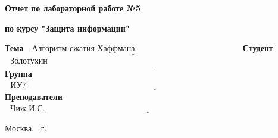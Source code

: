 \begin{center}
	\Large\textbf{Отчет по лабораторной работе №5}
	
	\Large\textbf {по курсу "Защита информации"}
\end{center}


\noindent\textbf{Тема} $\underline{\text{~~Алгоритм сжатия Хаффмана~~~~~~~~~~~~~~~~~~~~~~~~~~~~~~~~~~~~~~}}$\newline\newline
\noindent\textbf{Студент} $\underline{\text{~~Золотухин А.В.~~~~~~~~~~~~~~~~~~~~~~~~~~~~~~~~~~~~~~~~~~~~~~~~~~~~~~~~~~~~~~~~~~~~~~~~~~~~~~~~~~~~~~~~~~}}$\newline\newline
\noindent\textbf{Группа} $\underline{\text{~~ИУ7-74Б~~~~~~~~~~~~~~~~~~~~~~~~~~~~~~~~~~~~~~~~~~~~~~~~~~~~~~~~~~~~~~~~~~~~~~~~~~~~~~~~~~~~~~~~~~~~~~~~~~~~~~}}$\newline\newline
\noindent\textbf{Преподаватели} $\underline{\text{~~Чиж И.С. ~~~~~~~~~~~~~~~~~~~~~~~~~~~~~~~~~~~~~~~~~~~~~~~~~~~~~~~~~~~~~~~~~~~~~~~~~~~~~~~~~~~~~~~~}}$\newline

\begin{center}
	\vfill
	Москва, \the\year
	~г.
\end{center}
\restoregeometry